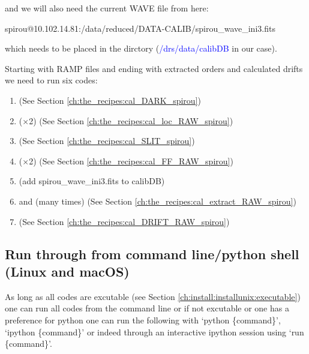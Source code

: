 \noindent and we will also need the current WAVE file from here:
\begin{cmdbox}
spirou@10.102.14.81:/data/reduced/DATA-CALIB/spirou_wave_ini3.fits
\end{cmdbox}

\noindent which needs to be placed in the  dirctory (\textcolor{blue}{/drs/data/calibDB} in our case).

\noindent Starting with RAMP files and ending with extracted orders and calculated drifts we need to run six codes:
\begin{enumerate}
\item \calDARK \hfill (See Section \ref{ch:the_recipes:cal_DARK_spirou})
\item \callocRAW ($\times$2) \hfill (See Section \ref{ch:the_recipes:cal_loc_RAW_spirou})
\item \calSLIT \hfill (See Section \ref{ch:the_recipes:cal_SLIT_spirou})
\item \calFFraw ($\times$2) \hfill (See Section \ref{ch:the_recipes:cal_FF_RAW_spirou})
\item (add spirou\_wave\_ini3.fits to calibDB) 
\item \calextractRAWAB and \calextractRAWC (many times) \hfill (See Section \ref{ch:the_recipes:cal_extract_RAW_spirou})
\item \calDRIFTRAW \hfill (See Section \ref{ch:the_recipes:cal_DRIFT_RAW_spirou})
\end{enumerate}





\subsection{Run through from command line/python shell (Linux and macOS)}
\label{chapter:using_the_drs:working_example:run_cmd}

As long as all codes are excutable (see Section \ref{ch:install:installunix:executable}) one can run all codes from the command line or if not excutable or one has a preference for python one can run the following with `python \{command\}', `ipython \{command\}' or indeed through an interactive ipython session using `run \{command\}'.

